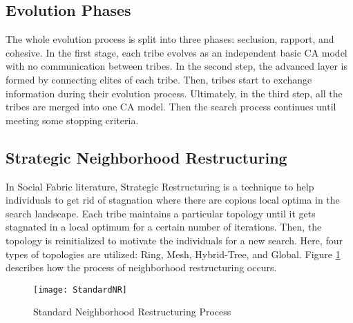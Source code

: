 \subsection{Evolution Phases}The whole evolution process is split into three phases: seclusion, rapport, and cohesive. In the first stage, each tribe evolves as an independent basic CA model with no communication between tribes. In the second step, the advanced layer is formed by connecting elites of each tribe. Then, tribes start to exchange information during their evolution process. Ultimately, in the third step, all the tribes are merged into one CA model. Then the search process continues until meeting some stopping criteria.
\subsection{Strategic Neighborhood Restructuring}In Social Fabric literature, Strategic Restructuring is a technique to help individuals to get rid of stagnation where there are copious local optima in the search landscape. Each tribe maintains a particular topology until it gets stagnated in a local optimum for a certain number of iterations. Then, the topology is reinitialized to motivate the individuals for a new search. Here, four types of topologies are utilized: Ring, Mesh, Hybrid-Tree, and Global. Figure \ref{fig:StandardNR} describes how the process of neighborhood restructuring occurs.
\begin{figure}[h]
	\texttt{[image: StandardNR]}
	\centering
	\caption{Standard Neighborhood Restructuring Process\cite{gg}}
	\label{fig:StandardNR}
\end{figure}

